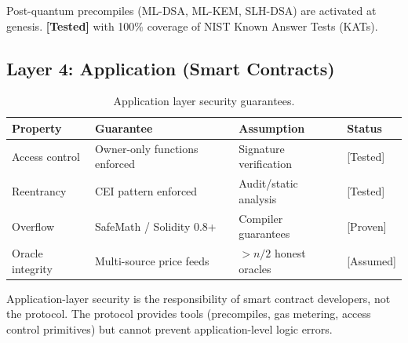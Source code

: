 Post-quantum precompiles (ML-DSA, ML-KEM, SLH-DSA) are activated at genesis.
\textbf{[Tested]} with 100\% coverage of NIST Known Answer Tests (KATs).

\subsection{Layer 4: Application (Smart Contracts)}

\begin{table}[ht]
\centering
\caption{Application layer security guarantees.}
\label{tab:application-security}
\begin{tabular}{llll}
\toprule
\textbf{Property} & \textbf{Guarantee} & \textbf{Assumption} & \textbf{Status} \\
\midrule
Access control & Owner-only functions enforced & Signature verification & [Tested] \\
Reentrancy & CEI pattern enforced & Audit/static analysis & [Tested] \\
Overflow & SafeMath / Solidity 0.8+ & Compiler guarantees & [Proven] \\
Oracle integrity & Multi-source price feeds & $> n/2$ honest oracles & [Assumed] \\
\bottomrule
\end{tabular}
\end{table}

Application-layer security is the responsibility of smart contract developers, not the
protocol. The protocol provides tools (precompiles, gas metering, access control
primitives) but cannot prevent application-level logic errors.

